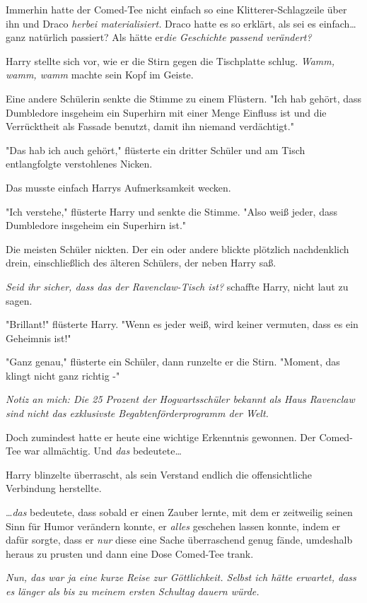 {Immerhin hatte der Comed-Tee nicht einfach so eine Klitterer-Schlagzeile über ihn und Draco \emph{herbei materialisiert.} Draco hatte es so erklärt, als sei es einfach… ganz natürlich passiert? Als hätte er\emph{die Geschichte passend verändert?}

Harry stellte sich vor, wie er die Stirn gegen die Tischplatte schlug. \emph{Wamm, wamm, wamm} machte sein Kopf im Geiste.

Eine andere Schülerin senkte die Stimme zu einem Flüstern. "Ich hab gehört, dass Dumbledore insgeheim ein Superhirn mit einer Menge Einfluss ist und die Verrücktheit als Fassade benutzt, damit ihn niemand verdächtigt."

"Das hab ich auch gehört," flüsterte ein dritter Schüler und am Tisch entlangfolgte verstohlenes Nicken.

Das musste einfach Harrys Aufmerksamkeit wecken.

"Ich verstehe," flüsterte Harry und senkte die Stimme. "Also weiß jeder, dass Dumbledore insgeheim ein Superhirn ist."

Die meisten Schüler nickten. Der ein oder andere blickte plötzlich nachdenklich drein, einschließlich des älteren Schülers, der neben Harry saß.

\emph{Seid ihr sicher, dass das der Ravenclaw-Tisch ist?} schaffte Harry, nicht laut zu sagen.

"Brillant!" flüsterte Harry. "Wenn es jeder weiß, wird keiner vermuten, dass es ein Geheimnis ist!"

"Ganz genau," flüsterte ein Schüler, dann runzelte er die Stirn. "Moment, das klingt nicht ganz richtig -"

\emph{Notiz an mich: Die 25 Prozent der Hogwartsschüler bekannt als Haus Ravenclaw sind nicht das exklusivste Begabtenförderprogramm der Welt.}

Doch zumindest hatte er heute eine wichtige Erkenntnis gewonnen. Der Comed-Tee war allmächtig. Und \emph{das} bedeutete…

Harry blinzelte überrascht, als sein Verstand endlich die offensichtliche Verbindung herstellte.

…\emph{das} bedeutete, dass sobald er einen Zauber lernte, mit dem er zeitweilig seinen Sinn für Humor verändern konnte, er \emph{alles} geschehen lassen konnte, indem er dafür sorgte, dass er \emph{nur} diese eine Sache überraschend genug fände, umdeshalb heraus zu prusten und dann eine Dose Comed-Tee trank.

\emph{Nun, das war ja eine kurze Reise zur Göttlichkeit. Selbst ich hätte erwartet, dass es länger als bis zu meinem ersten Schultag dauern würde.}

}
